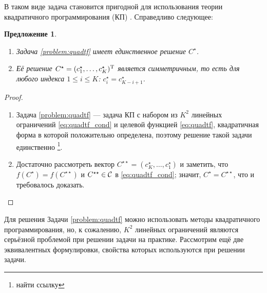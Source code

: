 \documentclass[10pt]{article}
\newtheorem{proposition}{Предложение}
\begin{document}
В таком виде задача становится пригодной для использования теории квадратичного программирования (КП) \cite{Gavurin1984}. Справедливо следующее:
\begin{proposition}\label{prop:uniqsymm}
\begin{enumerate}
\item Задача \ref{problem:quadtf} имеет единственное решение $C^\star$.
\item Её решение $C^{\star} = (c^\star_1, \ldots, c^\star_K)^{\mathrm{T}}$ является симметричным, то есть для любого индекса $1 \le i \le K$: $c^\star_i = c^\star_{K - i + 1}$.
\end{enumerate}
\end{proposition}
\begin{proof}
\begin{enumerate}
\item Задача \ref{problem:quadtf} --- задача КП с набором из $K^2$ линейных ограничений \eqref{eq:quadtf_cond} и целевой функцией \eqref{eq:quadtf}, квадратичная форма в которой положительно определена, поэтому решение такой задачи единственно \footnote{найти ссылку}.
\item Достаточно рассмотреть вектор $C^{\star \star} = (c^\star_K, \ldots, c^\star_1)$ и заметить, что $f(C^\star) = f(C^{\star \star})$ и $C^{\star \star} \in \mathcal{C}$ в \eqref{eq:quadtf_cond}; значит, $C^\star = C^{\star \star}$, что и требовалось доказать.
\end{enumerate}
\end{proof}
Для решения Задачи \ref{problem:quadtf} можно использовать методы квадратичного программирования, но, к сожалению, $K^2$ линейных ограничений являются серьёзной проблемой при решении задачи на практике. Рассмотрим ещё две эквивалентных формулировки, свойства которых используются при решении задачи.
\end{document}

